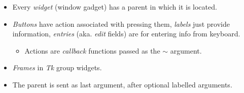 \documentclass{beamer}
\newcommand{\tmem}[1]{{\em #1\/}}
\newcommand{\tmverbatim}[1]{\text{{\ttfamily{#1}}}}
\begin{document}
\begin{itemize}
  
  \item Every {\tmem{widget}} (window gadget) has a parent in which it is
  located.
  
  \item {\tmem{Buttons}} have action associated with pressing them,
  {\tmem{labels}} just provide information, {\tmem{entries}} (aka.
  {\tmem{edit}} fields) are for entering info from keyboard.
  \begin{itemize}
    \item Actions are {\tmem{callback}} functions passed as the
    $\sim$\tmverbatim{command} argument.
  \end{itemize}
  \item {\tmem{Frames}} in {\tmem{Tk}} group widgets.
  
  \item The parent is sent as last argument, after optional labelled
  arguments.
  

\end{itemize}
\end{document}
